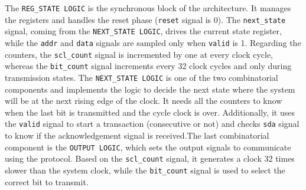 The \texttt{REG\_STATE LOGIC} is the synchronous block of the architecture. It manages the registers and handles the reset phase (\texttt{reset} signal is 0). The \texttt{next\_state} signal, coming from the \texttt{NEXT\_STATE LOGIC}, drives the current state register, while the \texttt{addr} and \texttt{data} signals are sampled only when \texttt{valid} is 1. Regarding the counters, the \texttt{scl\_count} signal is incremented by one at every clock cycle, whereas the \texttt{bit\_count} signal increments every 32 clock cycles and only during transmission states. The \texttt{NEXT\_STATE LOGIC} is one of the two combinatorial components and implements the logic to decide the next state where the system will be at the next rising edge of the clock. It needs all the counters to know when the last bit is transmitted and the \IIC{} cycle clock is over. Additionally, it uses the \texttt{valid} signal to start a transaction (consecutive or not) and checks \texttt{sda} signal to know if the acknowledgement signal is received.The last combinatorial component is the \texttt{OUTPUT LOGIC}, which sets the output signals to communicate using the \IIC{} protocol. Based on the \texttt{scl\_count} signal, it generates a clock 32 times slower than the system clock, while the \texttt{bit\_count} signal is used to select the correct bit to transmit.

\newpage